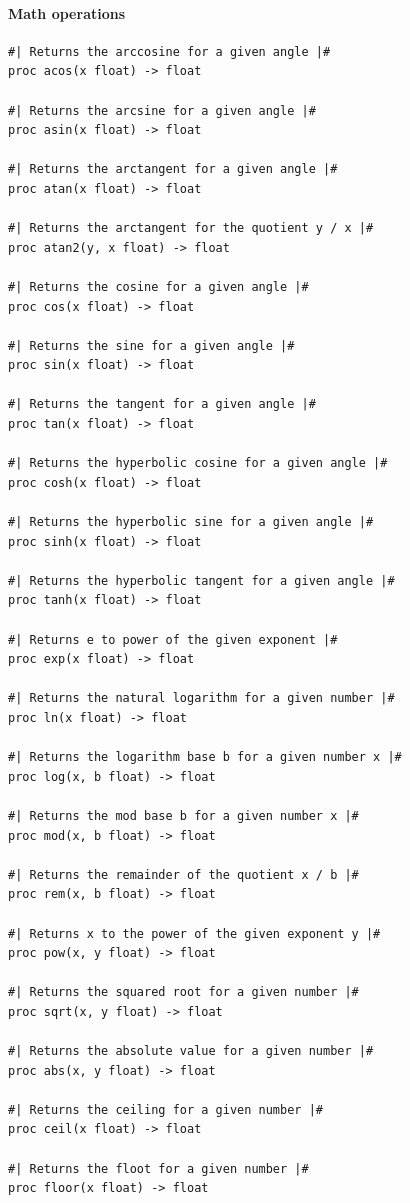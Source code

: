 \documentclass[12pt, titlepage]{article}
\begin{document}
\paragraph{Math operations}
\begin{verbatim}
#| Returns the arccosine for a given angle |#
proc acos(x float) -> float

#| Returns the arcsine for a given angle |#
proc asin(x float) -> float

#| Returns the arctangent for a given angle |#
proc atan(x float) -> float

#| Returns the arctangent for the quotient y / x |#
proc atan2(y, x float) -> float

#| Returns the cosine for a given angle |#
proc cos(x float) -> float

#| Returns the sine for a given angle |#
proc sin(x float) -> float

#| Returns the tangent for a given angle |#
proc tan(x float) -> float

#| Returns the hyperbolic cosine for a given angle |#
proc cosh(x float) -> float

#| Returns the hyperbolic sine for a given angle |#
proc sinh(x float) -> float

#| Returns the hyperbolic tangent for a given angle |#
proc tanh(x float) -> float

#| Returns e to power of the given exponent |#
proc exp(x float) -> float

#| Returns the natural logarithm for a given number |#
proc ln(x float) -> float

#| Returns the logarithm base b for a given number x |#
proc log(x, b float) -> float

#| Returns the mod base b for a given number x |#
proc mod(x, b float) -> float

#| Returns the remainder of the quotient x / b |#
proc rem(x, b float) -> float

#| Returns x to the power of the given exponent y |#
proc pow(x, y float) -> float

#| Returns the squared root for a given number |#
proc sqrt(x, y float) -> float

#| Returns the absolute value for a given number |#
proc abs(x, y float) -> float

#| Returns the ceiling for a given number |#
proc ceil(x float) -> float

#| Returns the floot for a given number |#
proc floor(x float) -> float
\end{verbatim}
\end{document}
